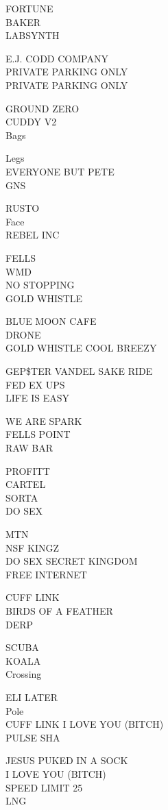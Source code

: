 \documentclass[10pt,letterpaper]{article}
\begin{document}
FORTUNE\\
BAKER\\
LABSYNTH

E.J. CODD COMPANY\\
PRIVATE PARKING ONLY\\
PRIVATE PARKING ONLY

GROUND ZERO\\
CUDDY V2\\
Bags

Legs\\
EVERYONE BUT PETE\\
GNS

RUSTO\\
Face\\
REBEL INC

FELLS\\
WMD\\
NO STOPPING\\
GOLD WHISTLE

BLUE MOON CAFE\\
DRONE\\
GOLD WHISTLE COOL BREEZY

GEP\$TER VANDEL SAKE RIDE\\
FED EX UPS\\
LIFE IS EASY

WE ARE SPARK\\
FELLS POINT\\
RAW BAR

PROFITT\\
CARTEL\\
SORTA\\
DO SEX

MTN\\
NSF KINGZ\\
DO SEX SECRET KINGDOM\\
FREE INTERNET

CUFF LINK\\
BIRDS OF A FEATHER\\
DERP

SCUBA\\
KOALA\\
Crossing

ELI LATER\\
Pole\\
CUFF LINK I LOVE YOU (BITCH)\\
PULSE SHA

JESUS PUKED IN A SOCK\\
I LOVE YOU (BITCH)\\
SPEED LIMIT 25\\
LNG
\end{document}
